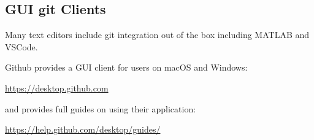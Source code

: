\subsection{GUI git Clients}
Many text editors include git integration out of the box including MATLAB and VSCode. 

Github provides a GUI client for users on macOS and Windows:
\begin{center}
\url{https://desktop.github.com}
\end{center}

and provides full guides on using their application:
\begin{center}
	\url{https://help.github.com/desktop/guides/}
\end{center}




